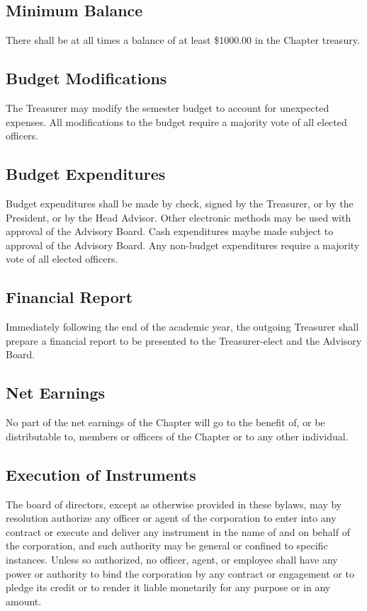 \documentclass{article}
\begin{document}
	\subsection{Minimum Balance}
	There shall be at all times a balance of at least \$1000.00 in the Chapter treasury.
	\subsection{Budget Modifications}
	The Treasurer may modify the semester budget to account for unexpected expenses. All modifications to the budget require a majority vote of all elected officers.
	\subsection{Budget Expenditures}
	Budget expenditures shall be made by check, signed by the Treasurer, or by the President, or by the Head Advisor. Other electronic methods may be used with approval of the Advisory Board. Cash expenditures maybe made subject to approval of the Advisory Board. Any non-budget expenditures require a majority vote of all elected officers.
	\subsection{Financial Report}
	Immediately following the end of the academic year, the outgoing Treasurer shall prepare a financial report to be presented to the Treasurer-elect and the Advisory Board.
	\subsection{Net Earnings}
	No part of the net earnings of the Chapter will go to the benefit of, or be distributable to, members or officers of the Chapter or to any other individual.
	\subsection{Execution of Instruments}
	The board of directors, except as otherwise provided in these bylaws, may by resolution authorize any officer or agent of the corporation to enter into any contract or execute and deliver any instrument in the name of and on behalf of the corporation, and such authority may be general or confined to specific instances. Unless so authorized, no officer, agent, or employee shall have any power or authority to bind the corporation by any contract or engagement or to pledge its credit or to render it liable monetarily for any purpose or in any amount.
\end{document}
